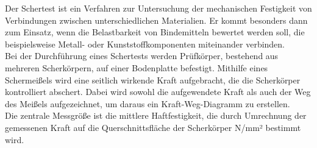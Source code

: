 Der Schertest ist ein Verfahren zur Untersuchung der mechanischen Festigkeit von Verbindungen zwischen unterschiedlichen Materialien. 
Er kommt besonders dann zum Einsatz, wenn die Belastbarkeit von Bindemitteln bewertet werden soll, die beispielsweise Metall- oder Kunststoffkomponenten miteinander verbinden.\\

Bei der Durchführung eines Schertests werden Prüfkörper, bestehend aus mehreren Scherkörpern, auf einer Bodenplatte befestigt. 
Mithilfe eines Schermeißels wird eine seitlich wirkende Kraft aufgebracht, die die Scherkörper kontrolliert abschert. 
Dabei wird sowohl die aufgewendete Kraft als auch der Weg des Meißels aufgezeichnet, um daraus ein Kraft-Weg-Diagramm zu erstellen.\\

Die zentrale Messgröße ist die mittlere Haftfestigkeit, die durch Umrechnung der gemessenen Kraft auf die Querschnittsfläche der Scherkörper N/mm² bestimmt wird.  \\

